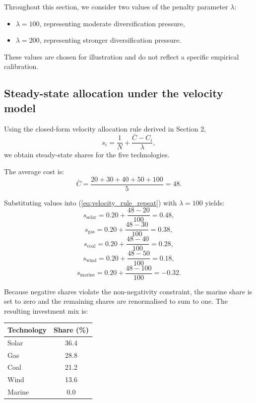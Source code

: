 \documentclass[preprint,authoryear,12pt]{elsarticle}
\begin{document}
Throughout this section, we consider two values of the penalty parameter $\lambda$:
\begin{itemize}
    \item $\lambda = 100$, representing moderate diversification pressure,
    \item $\lambda = 200$, representing stronger diversification pressure.
\end{itemize}
These values are chosen for illustration and do not reflect a specific empirical calibration.

\subsection{Steady-state allocation under the velocity model}

Using the closed-form velocity allocation rule derived in Section 2,
\begin{equation}
    s_i = \frac{1}{N} + \frac{\bar{C} - C_i}{\lambda},
    \label{eq:velocity_rule_repeat}
\end{equation}
we obtain steady-state shares for the five technologies.

The average cost is:
\[
    \bar{C} = \frac{20 + 30 + 40 + 50 + 100}{5} = 48.
\]

Substituting values into (\ref{eq:velocity_rule_repeat}) with $\lambda = 100$ yields:
\[
    s_{\text{solar}} = 0.20 + \frac{48 - 20}{100} = 0.48,
\]
\[
    s_{\text{gas}}      = 0.20 + \frac{48 - 30}{100} = 0.38,
\]
\[
    s_{\text{coal}}     = 0.20 + \frac{48 - 40}{100} = 0.28,
\]
\[
    s_{\text{wind}}     = 0.20 + \frac{48 - 50}{100} = 0.18,
\]
\[
    s_{\text{marine}}   = 0.20 + \frac{48 - 100}{100} = -0.32.
\]

Because negative shares violate the non-negativity constraint, the marine share is set to zero and
the remaining shares are renormalised to sum to one. The resulting investment mix is:
\begin{center}
\begin{tabular}{l c}
\toprule
Technology & Share (\%) \\
\midrule
Solar       & 36.4 \\
Gas         & 28.8 \\
Coal        & 21.2 \\
Wind        & 13.6 \\
Marine      & 0.0 \\
\bottomrule
\end{tabular}
\end{center}
\end{document}
